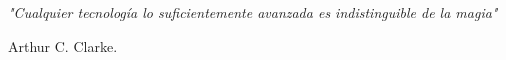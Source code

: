 \cleardoublepage %



\chapter*{}
\setlength{\leftmargin}{0.5\textwidth}
\setlength{\parsep}{0cm}
\addtolength{\topsep}{0.5cm}
\begin{flushright}
	\small\em{
		"Cualquier tecnología lo suficientemente avanzada es indistinguible de la magia"
	}
\end{flushright}
\begin{flushright}
	\small{
		Arthur C. Clarke.
	}
\end{flushright}

\cleardoublepage %

